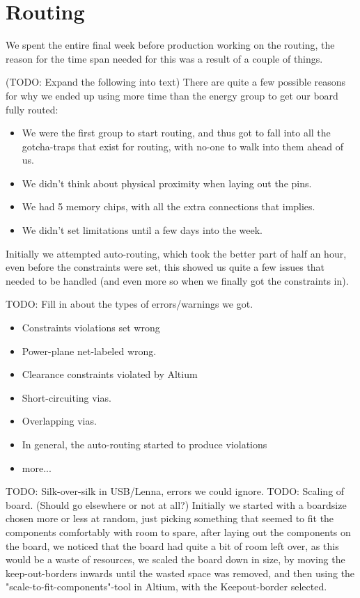 \section {Routing}

We spent the entire final week before production working on the routing,
the reason for the time span needed for this was a result of a couple of
things.

(TODO: Expand the following into text)
There are quite a few possible reasons for why we ended up using more time than the
energy group to get our board fully routed:
\begin {itemize}
\item We were the first group to start routing, and thus got to fall into all the gotcha-traps that
exist for routing, with no-one to walk into them ahead of us.
\item We didn't think about physical proximity when laying out the pins.
\item We had 5 memory chips, with all the extra connections that implies.
\item We didn't set limitations until a few days into the week.
\end {itemize}

Initially we attempted auto-routing, which took the better part of half an hour,
even before the constraints were set, this showed us quite a few issues that needed
to be handled (and even more so when we finally got the constraints in).

TODO: Fill in about the types of errors/warnings we got.
\begin{itemize}
\item Constraints violations set wrong
\item Power-plane net-labeled wrong.
\item Clearance constraints violated by Altium
\item Short-circuiting vias.
\item Overlapping vias.
\item In general, the auto-routing started to produce violations 
\item more...
\end{itemize}
TODO: Silk-over-silk in USB/Lenna, errors we could ignore.
TODO: Scaling of board. (Should go elsewhere or not at all?)
Initially we started with a boardsize chosen more or less at random, just picking something
that seemed to fit the components comfortably with room to spare, after laying out the components
on the board, we noticed that the board had quite a bit of room left over, as this would be a waste
of resources, we scaled the board down in size, by moving the keep-out-borders inwards until the wasted
space was removed, and then using the "scale-to-fit-components"-tool in Altium, with the Keepout-border
selected.


